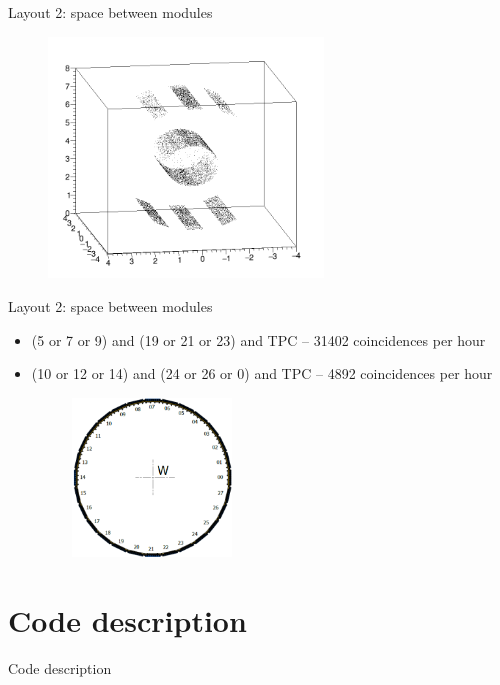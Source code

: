 \documentclass{beamer}
\begin{document}
\begin{frame}{Layout 2: space between modules}
\begin{figure}
\includegraphics[width=0.65\textwidth]{images/spaces.png}
\end{figure}
\end{frame}

\begin{frame}{Layout 2: space between modules}
\begin{itemize}
\item (5 or 7 or 9) and (19 or 21 or 23) and TPC -- 31402 coincidences per hour
\item (10 or 12 or 14) and (24 or 26 or 0) and TPC -- 4892 coincidences per hour
\begin{figure}
\includegraphics[width=0.4\textwidth]{images/nocoin.png}
\end{figure}
\end{itemize}
\end{frame}

\section{Code description}

\begin{frame}
\vfill
\centering
\Huge{Code description}

\vfill
\end{frame}
\end{document}
